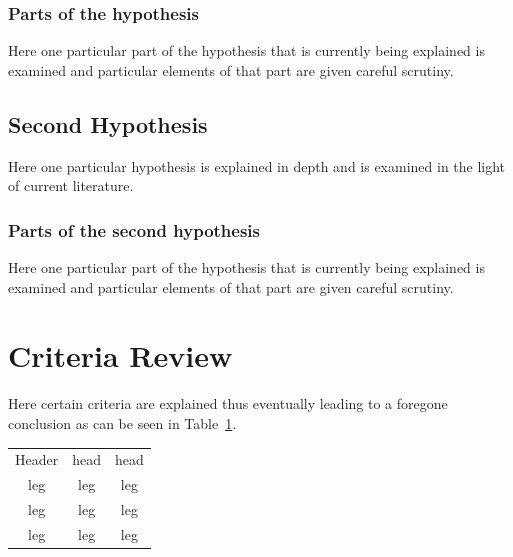 \subsubsection{Parts of the hypothesis}

Here one particular part of the hypothesis that is 
currently being explained is examined and particular
elements of that part are given careful scrutiny.


\subsection{Second Hypothesis}

Here one particular hypothesis is explained in depth
and is examined in the light of current literature.

\subsubsection{Parts of the second hypothesis}

Here one particular part of the hypothesis that is 
currently being explained is examined and particular
elements of that part are given careful scrutiny.

\section{Criteria Review}

Here certain criteria are explained thus eventually
leading to a foregone conclusion as can be seen in
Table~\ref{nevermore}.
\begin{table}[h!tb] \centering
    \begin{tabular}{c|c|c}
        Header & head  & head\\ 
        leg & leg & leg \\
        leg & leg & leg \\
        leg & leg & leg \\
    \end{tabular}
\setlength{\captionwidth}{3.5 in}
\label{nevermore}

\vspace{ 2 in}
\end{table}

